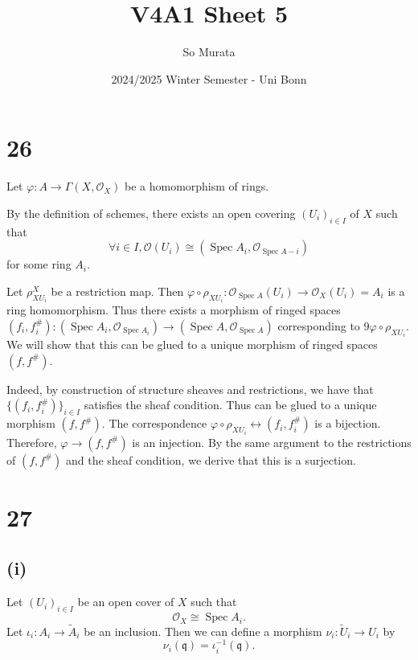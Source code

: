 \documentclass{article}
\title{V4A1 Sheet 5}
\author{So Murata}
\date{2024/2025 Winter Semester - Uni Bonn}
\numberwithin{equation}{section}
\DeclareMathOperator{\Spec}{Spec}
\begin{document}
\maketitle
\section*{26}

Let $\varphi:A\to\Gamma(X,\mathcal{O}_X)$ be a homomorphism of rings.\\

\par By the definition of schemes, there exists an open covering $(U_i)_{i\in I}$ of $X$ such that 
\begin{equation*}
\forall i\in I, \mathcal{O}(U_i) \cong (\Spec A_i,\mathcal{O}_{\Spec A-i})
\end{equation*}
for some ring $A_i$.\\
\par Let $\rho^{X}_{XU_i}$ be a restriction map. Then $\varphi\circ\rho_{XU_i}:\mathcal{O}_{\Spec A}(U_i)\to \mathcal{O}_X(U_i)=A_i$ is a ring homomorphism. Thus there exists a morphism of ringed spaces $(f_i,f_i^{\#}):(\Spec A_i,\mathcal{O}_{\Spec A_i})\to(\Spec A,\mathcal{O}_{\Spec A})$ corresponding to $9\varphi\circ\rho_{XU_i}$. We will show that this can be glued to a unique morphism of ringed spaces $(f,f^{\#})$.\\
\par Indeed, by construction of structure sheaves and restrictions, we have that $\{(f_i,f_i^{\#})\}_{i\in I}$ satisfies the sheaf condition. Thus can be glued to a unique morphism $(f,f^{\#})$. The correspondence $\varphi\circ\rho_{XU_i}\leftrightarrow (f_i,f_i^{\#})$ is a bijection. Therefore, $\varphi\to(f,f^{\#})$ is an injection. By the same argument to the restrictions of $(f,f^{\#})$ and the sheaf condition, we derive that this is a surjection. 

\section*{27}

\subsection*{(i)}

Let $(U_i)_{i\in I}$ be an open cover of $X$ such that 
\begin{equation*}
\mathcal{O}_X \cong \Spec A_i.
\end{equation*}
Let $\iota_i:A_i\to \tilde{A}_i$ be an inclusion. Then we can define a morphism $\nu_i:\tilde{U}_i\to U_i$ by 
\begin{equation*}
\nu_i(\mathfrak{q}) = \iota_i^{-1}(\mathfrak{q}).
\end{equation*}
\end{document}
